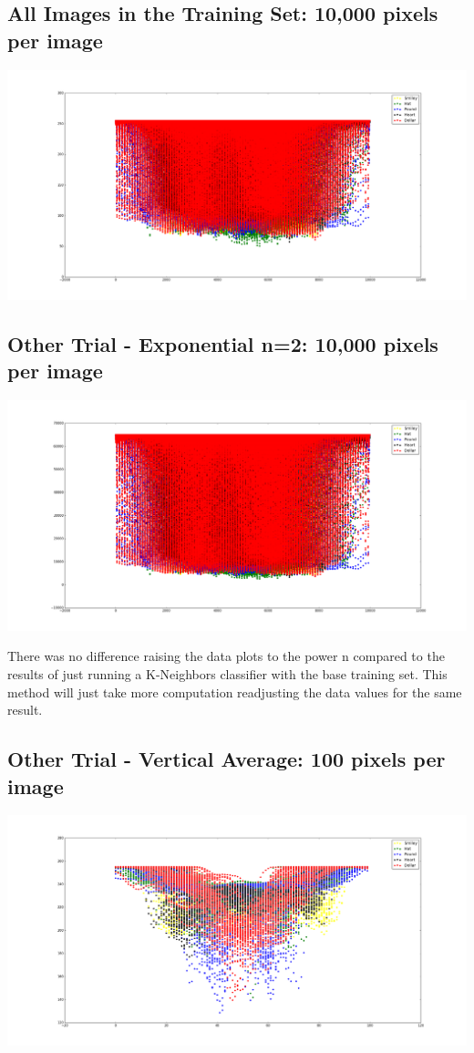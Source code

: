 \documentclass{article}
\begin{document}
 \subsection{All Images in the Training Set: 10,000 pixels per image}
 \includegraphics[width=1.1\textwidth]{figure_2.png}

  \subsection{Other Trial - Exponential n=2: 10,000 pixels per image}
  \includegraphics[width=1.1\textwidth]{figure_3.png}
  
  There was no  difference raising the data plots to the power n compared to the results of just running a K-Neighbors classifier with the base training set. This method will just take more computation readjusting the data values for the same result.
  
  \subsection{Other Trial - Vertical Average: 100 pixels per image}
  \includegraphics[width=1.1\textwidth]{figure_4.png}
  
\end{document}
